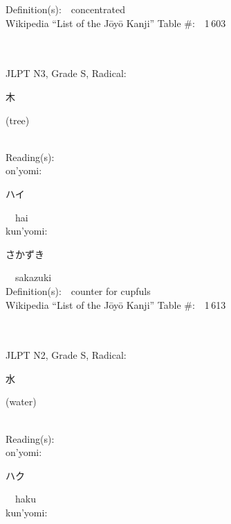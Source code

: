 \begin{multicols}{2}
Definition(s):\ \ concentrated \\
Wikipedia ``List of the J\=oy\=o Kanji'' Table \#:\ \ 1\,603 \\
\ \ \\
{\fontsize{34pt}{40pt}  }\ \ \\  %
{JLPT N3, Grade S, Radical:\ \ {\begin{CJK}{UTF8}{min} 木 \end{CJK}} (tree) } \\
Reading(s):\ \ \\
{\hspace*{1em}}on'yomi:\ \ \\
{\hspace*{2em}}{\begin{CJK}{UTF8}{min} ハイ \end{CJK}}\ \ hai\ \ \\
{\hspace*{1em}}kun'yomi:\ \ \\
{\hspace*{2em}}{\begin{CJK}{UTF8}{min} さかずき \end{CJK}}\ \ sakazuki\ \ \\
Definition(s):\ \ counter for cupfuls \\
Wikipedia ``List of the J\=oy\=o Kanji'' Table \#:\ \ 1\,613 \\
\ \ \\
{\fontsize{34pt}{40pt}  }\ \ \\  %
{JLPT N2, Grade S, Radical:\ \ {\begin{CJK}{UTF8}{min} 水 \end{CJK}} (water) } \\
Reading(s):\ \ \\
{\hspace*{1em}}on'yomi:\ \ \\
{\hspace*{2em}}{\begin{CJK}{UTF8}{min} ハク \end{CJK}}\ \ haku\ \ \\
{\hspace*{1em}}kun'yomi:\ \ \\

\end{multicols}
